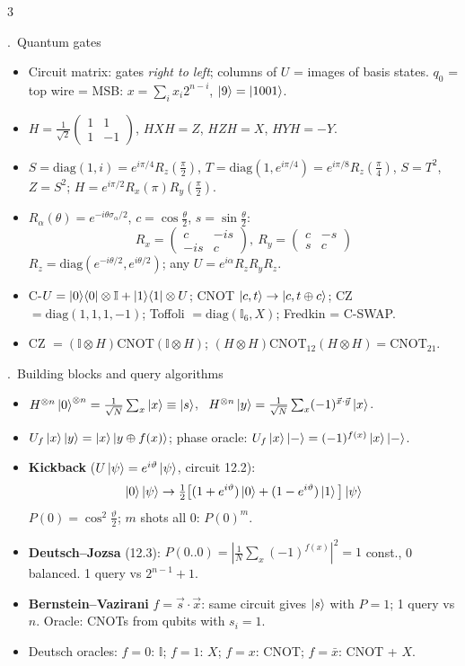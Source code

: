 \documentclass[8pt,a4paper]{extarticle}
\newcounter{sec}\newcounter{ssec}[sec]
\newcommand{\sect}[1]{\stepcounter{sec}\par\vspace{2pt}\noindent\colorbox{hd}{\parbox{\dimexpr\linewidth-2\fboxsep}{\color{white}\bfseries\strut\arabic{sec}.\ #1}}\par\vspace{0.5pt}}
\newcommand{\id}{\mathbb{I}}
\newcommand{\pr}[1]{\ket{#1}\!\bra{#1}}
\begin{document}
\begin{multicols}{3}
\sect{Quantum gates}
\begin{itemize}
\item Circuit matrix: gates \emph{right to left}; columns of $U$ = images of basis states. $q_0$ = top wire = MSB: $x=\sum_ix_i2^{n-i}$, $\ket9=\ket{1001}$.
\item $H=\frac1{\sqrt2}\begin{pmatrix}1&1\\1&-1\end{pmatrix}$, $HXH=Z$, $HZH=X$, $HYH=-Y$.
\item $S=\mathrm{diag}(1,i)=e^{i\pi/4}R_z(\frac\pi2)$, $T=\mathrm{diag}(1,e^{i\pi/4})=e^{i\pi/8}R_z(\frac\pi4)$, $S=T^2$, $Z=S^2$; $H=e^{i\pi/2}R_x(\pi)R_y(\frac\pi2)$.
\item $R_\alpha(\theta)=e^{-i\theta\sigma_\alpha/2}$, $c=\cos\frac\theta2$, $s=\sin\frac\theta2$:
\[R_x=\begin{pmatrix}c&-is\\-is&c\end{pmatrix},\ R_y=\begin{pmatrix}c&-s\\s&c\end{pmatrix}\]
$R_z=\mathrm{diag}(e^{-i\theta/2},e^{i\theta/2})$; any $U=e^{i\alpha}R_z R_y R_z$.
\item C-$U=\pr0\otimes\id+\pr1\otimes U$; CNOT $\ket{c,t}\to\ket{c,t\oplus c}$; CZ $=\mathrm{diag}(1,1,1,-1)$; Toffoli $=\mathrm{diag}(\id_6,X)$; Fredkin = C-SWAP.
\item CZ $=(\id\otimes H)$CNOT$(\id\otimes H)$; $(H\otimes H)\text{CNOT}_{12}(H\otimes H)=\text{CNOT}_{21}$.
\end{itemize}

\sect{Building blocks and query algorithms}
\begin{itemize}
\item $H^{\otimes n}\ket0^{\otimes n}=\frac1{\sqrt N}\sum_x\ket x\equiv\ket s$, \ $H^{\otimes n}\ket y=\frac1{\sqrt N}\sum_x(-1)^{\vec x\cdot\vec y}\ket x$.
\item $U_f\ket x\ket y=\ket x\ket{y\oplus f(x)}$; phase oracle: $U_f\ket x\ket-=(-1)^{f(x)}\ket x\ket-$.
\item \textbf{Kickback} ($U\ket\psi=e^{i\vartheta}\ket\psi$, circuit 12.2):
\[\ket0\ket\psi\to\tfrac12\big[(1+e^{i\vartheta})\ket0+(1-e^{i\vartheta})\ket1\big]\ket\psi\]
$P(0)=\cos^2\frac\vartheta2$; $m$ shots all $0$: $P(0)^m$.
\item \textbf{Deutsch--Jozsa} (12.3): $P(0..0)=|\frac1N\sum_x(-1)^{f(x)}|^2=1$ const., 0 balanced. 1 query vs $2^{n-1}+1$.
\item \textbf{Bernstein--Vazirani} $f=\vec s\cdot\vec x$: same circuit gives $\ket s$ with $P=1$; 1 query vs $n$. Oracle: CNOTs from qubits with $s_i=1$.
\item Deutsch oracles: $f=0$: $\id$; $f=1$: $X$; $f=x$: CNOT; $f=\bar x$: CNOT + $X$.
\end{itemize}


\end{multicols}
\end{document}
